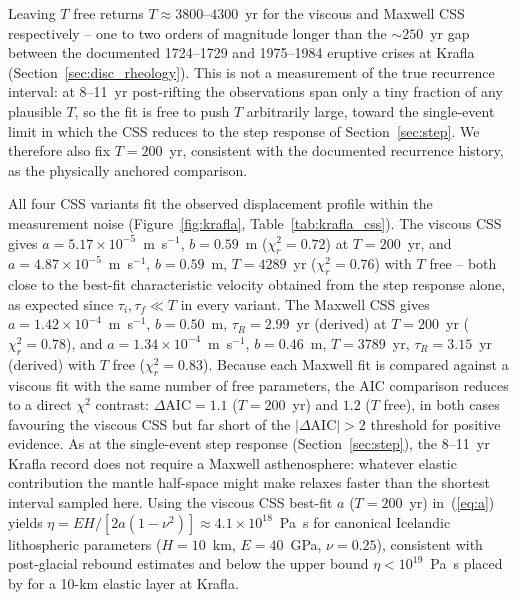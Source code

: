 \documentclass[extra]{gji}
\begin{document}
Leaving $T$ free returns $T \approx 3800$--$4300$~yr for the viscous and
Maxwell CSS respectively -- one to two orders of magnitude longer than
the $\sim250$~yr gap between the documented 1724--1729 and 1975--1984
eruptive crises at Krafla (Section~\ref{sec:disc_rheology}).  This is not
a measurement of the true recurrence interval: at 8--11~yr post-rifting
the observations span only a tiny fraction of any plausible $T$, so the
fit is free to push $T$ arbitrarily large, toward the single-event limit
in which the CSS reduces to the step response of
Section~\ref{sec:step}.  We therefore also fix $T = 200$~yr, consistent
with the documented recurrence history, as the physically anchored
comparison.

All four CSS variants fit the observed displacement profile within the
measurement noise (Figure~\ref{fig:krafla}, Table~\ref{tab:krafla_css}).
The viscous CSS gives $a = 5.17\times10^{-5}$~m~s$^{-1}$,
$b = 0.59$~m ($\chi^2_r = 0.72$) at $T = 200$~yr, and
$a = 4.87\times10^{-5}$~m~s$^{-1}$, $b = 0.59$~m,
$T = 4289$~yr ($\chi^2_r = 0.76$) with $T$ free -- both close to the
best-fit characteristic velocity obtained from the step response alone,
as expected since $\tau_i,\tau_f \ll T$ in every variant.  The Maxwell
CSS gives $a = 1.42\times10^{-4}$~m~s$^{-1}$, $b = 0.50$~m,
$\tau_R = 2.99$~yr (derived) at $T = 200$~yr ($\chi^2_r = 0.78$), and
$a = 1.34\times10^{-4}$~m~s$^{-1}$, $b = 0.46$~m,
$T = 3789$~yr, $\tau_R = 3.15$~yr (derived) with $T$ free
($\chi^2_r = 0.83$).  Because each Maxwell fit is compared against a
viscous fit with the same number of free parameters, the AIC comparison
reduces to a direct $\chi^2$ contrast: $\Delta\mathrm{AIC} = 1.1$
($T = 200$~yr) and $1.2$ ($T$ free), in both cases favouring the viscous
CSS but far short of the $|\Delta\mathrm{AIC}| > 2$ threshold for
positive evidence.  As at the single-event step response
(Section~\ref{sec:step}), the 8--11~yr Krafla record does not require a
Maxwell asthenosphere: whatever elastic contribution the mantle
half-space might make relaxes faster than the shortest interval sampled
here.  Using the viscous CSS best-fit $a$ ($T = 200$~yr) in~(\ref{eq:a})
yields $\eta = EH/[2a(1-\nu^2)] \approx 4.1\times10^{18}$~Pa~s for
canonical Icelandic lithospheric parameters ($H = 10$~km, $E = 40$~GPa,
$\nu = 0.25$), consistent with post-glacial rebound estimates
\citep{sigmundsson2010geodetic} and below the upper bound
$\eta < 10^{19}$~Pa~s placed by \citet{sigmundsson1991postglacial} for a 10-km
elastic layer at Krafla.
\end{document}
